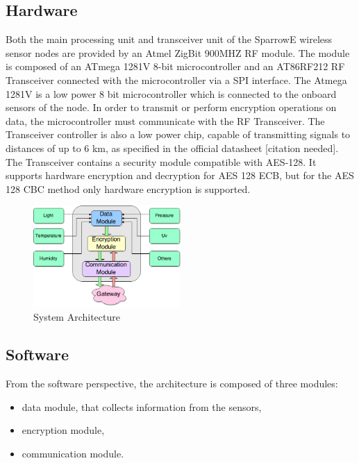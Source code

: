 \label{chap:arch}
\subsection{Hardware}

Both the main processing unit and transceiver unit of the SparrowE wireless sensor nodes are provided by an Atmel
ZigBit 900MHZ RF module. The module is composed of an ATmega 1281V 8-bit microcontroller and an
AT86RF212 RF Transceiver connected with the microcontroller via a SPI interface. The Atmega 1281V is a low power 8 bit microcontroller
which is connected to the onboard sensors of the node. In order to transmit or perform encryption operations on 
data, the microcontroller must communicate with the RF Transceiver. The Transceiver controller is also a low power chip,
capable of transmitting signals to distances of up to 6 km, as specified in the official datasheet [citation needed]. The Transceiver contains a security module compatible
with AES-128. It supports hardware encryption and decryption for AES 128 ECB, but for the AES
128 CBC method only hardware encryption is supported.


\begin{figure}[ht] \centering
  \includegraphics[width=0.5\textwidth]{img/wsn-soa-system-arch.png}
  \caption{System Architecture}
\end{figure}

\subsection{Software}

From the software perspective, the architecture is composed of three modules:
\begin{itemize}
\item data module, that
collects information from the sensors,
\item encryption module,
\item communication module.
\end{itemize}

